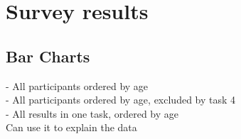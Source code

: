 \section{Survey results}

\subsection{Bar Charts}

- All participants ordered by age \\
- All participants ordered by age, excluded by task 4 \\
- All results in one task, ordered by age \\ 

Can use it to explain the data